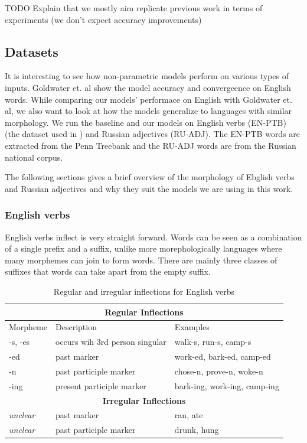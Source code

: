 TODO Explain that we mostly aim replicate previous work in terms of experiments (we don't expect accuracy improvements)

\subsection{Datasets}

It is interesting to see how non-parametric models perform on various types of
inputs. Goldwater et. al show the model accuracy and convergeence on English
words. While comparing our models' performace on English with Goldwater et. al,
we also want to look at how the models generalize to languages with similar
morphology. We run the baseline and our models on English verbs (EN-PTB) (the
dataset used in \cite{goldwater2011}) and Russian adjectives (RU-ADJ). The
EN-PTB words are extracted from the Penn Treebank and the RU-ADJ words are from
the Russian national corpus.

The following sections gives a brief overview of the morphology of Ebglish
verbs and Russian adjectives and why they suit the models we are using in this
work.  

\subsubsection{English verbs}

English verbs inflect is very straight forward. Words can be seen as a
combination of a single prefix and a suffix, unlike more morephologically
languages where many morphemes can join to form words. There are mainly three
classes of suffixes that words can take apart from the empty suffix.

\begin{table}[h]
\centering
\begin{tabular}{lll}
\hline
\multicolumn{3}{c}{\textbf{Regular Inflections}} \\
\hline
Morpheme & Description & Examples \\
\hline
-s, -es & occurs wih 3rd person singular & walk-s, run-s, camp-s \\
-ed & past marker & work-ed, bark-ed, camp-ed \\
-n & past participle marker & chose-n, prove-n, woke-n \\
-ing & present participle marker & bark-ing, work-ing, camp-ing \\
\hline
\multicolumn{3}{c}{\textbf{Irregular Inflections}} \\
\hline
\textit{unclear} & past marker & ran, ate \\
\textit{unclear} & past participle marker & drunk, hung \\
\hline
\end{tabular}
\caption{\label{enInflections}Regular and irregular inflections for English verbs}
\end{table}



